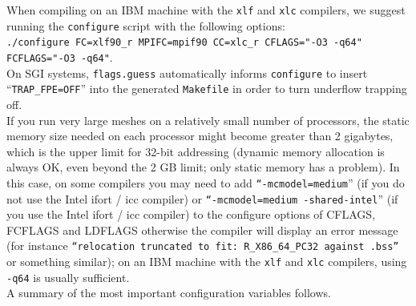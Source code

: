 \documentclass[oneside,english]{book}
\begin{document}
When compiling on an IBM machine with the \texttt{xlf} and \texttt{xlc} compilers, we suggest running the \texttt{configure} script
with the following options:\\

\noindent\texttt{./configure FC=xlf90\_r MPIFC=mpif90 CC=xlc\_r CFLAGS="-O3 -q64" FCFLAGS="-O3 -q64"}.\\

On SGI systems, \texttt{flags.guess} automatically informs \texttt{configure}
to insert ``\texttt{TRAP\_FPE=OFF}'' into the generated \texttt{Makefile}
in order to turn underflow trapping off.\\

If you run very large meshes on a relatively small number
of processors, the static memory size needed on each processor might become
greater than 2 gigabytes, which is the upper limit for 32-bit addressing
(dynamic memory allocation is always OK, even beyond the 2 GB limit; only static memory has a problem).
In this case, on some compilers you may need to add \texttt{``-mcmodel=medium}'' (if you do not use the Intel ifort / icc compiler)
or \texttt{``-mcmodel=medium -shared-intel}'' (if you use the Intel ifort / icc compiler)
to the configure options of CFLAGS, FCFLAGS and LDFLAGS otherwise the compiler will display an error
message (for instance \texttt{``relocation truncated to fit: R\_X86\_64\_PC32 against .bss''} or something similar);
on an IBM machine with the \texttt{xlf} and \texttt{xlc} compilers, using \texttt{-q64} is usually sufficient.\\

A summary of the most important configuration variables follows.
\end{document}
